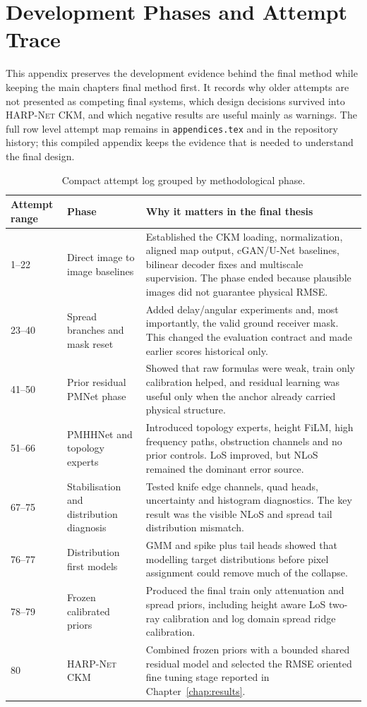 \clearpage
\chapter{Development Phases and Attempt Trace}
\begingroup
\small

This appendix preserves the development evidence behind the final method while
keeping the main chapters final method first. It records why older attempts are
not presented as competing final systems, which design decisions survived into
\textsc{HARP-Net CKM}, and which negative results are useful mainly as
warnings. The full row level attempt map remains in \texttt{appendices.tex} and
in the repository history; this compiled appendix keeps the evidence that is
needed to understand the final design.

\begin{table}[htbp]
\centering
\caption{Compact attempt log grouped by methodological phase.}
\label{tab:compact_attempt_log}
\scriptsize
\setlength{\tabcolsep}{3pt}
\begin{tabularx}{\textwidth}{p{}p{}X}
\toprule
Attempt range & Phase & Why it matters in the final thesis \\
\midrule
1--22 & Direct image to image baselines & Established the CKM loading, normalization, aligned map output, cGAN/U-Net baselines, bilinear decoder fixes and multiscale supervision. The phase ended because plausible images did not guarantee physical RMSE. \\
23--40 & Spread branches and mask reset & Added delay/angular experiments and, most importantly, the valid ground receiver mask. This changed the evaluation contract and made earlier scores historical only. \\
41--50 & Prior residual PMNet phase & Showed that raw formulas were weak, train only calibration helped, and residual learning was useful only when the anchor already carried physical structure. \\
51--66 & PMHHNet and topology experts & Introduced topology experts, height FiLM, high frequency paths, obstruction channels and no prior controls. LoS improved, but NLoS remained the dominant error source. \\
67--75 & Stabilisation and distribution diagnosis & Tested knife edge channels, quad heads, uncertainty and histogram diagnostics. The key result was the visible NLoS and spread tail distribution mismatch. \\
76--77 & Distribution first models & GMM and spike plus tail heads showed that modelling target distributions before pixel assignment could remove much of the collapse. \\
78--79 & Frozen calibrated priors & Produced the final train only attenuation and spread priors, including height aware LoS two-ray calibration and log domain spread ridge calibration. \\
80 & \textsc{HARP-Net CKM} & Combined frozen priors with a bounded shared residual model and selected the RMSE oriented fine tuning stage reported in Chapter~\ref{chap:results}. \\
\bottomrule
\end{tabularx}
\end{table}

